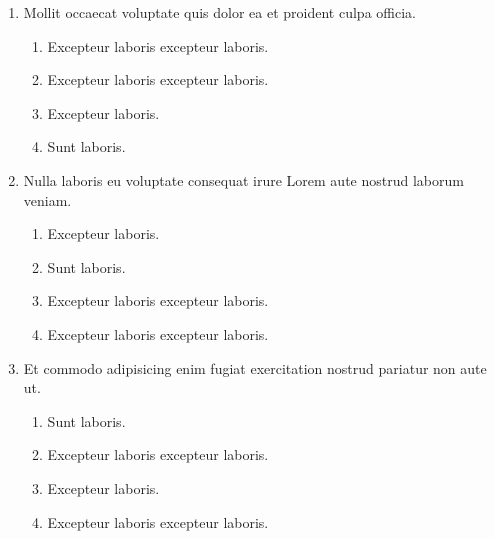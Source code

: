 \documentclass[a4paper,12pt]{article}
\begin{document}
\begin{enumerate}[label=\textbf{\arabic*.}]
\begin{multicols}{2}
\end{multicols}
\item Mollit occaecat voluptate quis dolor ea et proident culpa officia.
\begin{multicols}{2}
	\begin{enumerate}
		\item  Excepteur laboris excepteur laboris.
  
		\item  Excepteur laboris excepteur laboris.
    
		\item  Excepteur laboris.
    
		\item  Sunt laboris.
    
	\end{enumerate}

\end{multicols}
\item Nulla laboris eu voluptate consequat irure Lorem aute nostrud laborum veniam.
\begin{multicols}{2}
	\begin{enumerate}
		\item  Excepteur laboris.
    
		\item  Sunt laboris.
    
		\item  Excepteur laboris excepteur laboris.
    
		\item  Excepteur laboris excepteur laboris.
  
	\end{enumerate}

\end{multicols}
\item Et commodo adipisicing enim fugiat exercitation nostrud pariatur non aute ut.
\begin{multicols}{2}
	\begin{enumerate}
		\item  Sunt laboris.
    
		\item  Excepteur laboris excepteur laboris.
  
		\item  Excepteur laboris.
    
		\item  Excepteur laboris excepteur laboris.
    
	\end{enumerate}


\end{multicols}
\end{enumerate}
\end{document}
